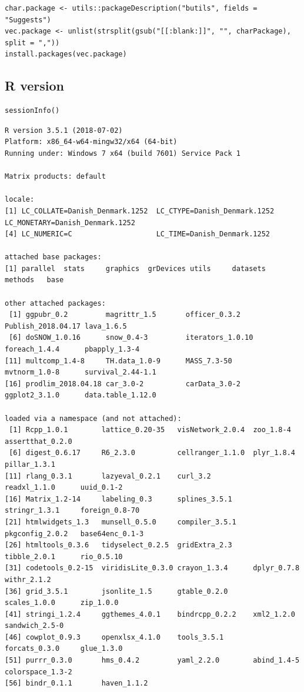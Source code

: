 \documentclass{article}
\begin{document}
\lstset{language=r,label= ,caption= ,captionpos=b,numbers=none}
\begin{lstlisting}
char.package <- utils::packageDescription("butils", fields = "Suggests")
vec.package <- unlist(strsplit(gsub("[[:blank:]]", "", charPackage), split = ","))
install.packages(vec.package)
\end{lstlisting}

\subsection{R version}
\label{sec:orgc6286c1}

\lstset{language=r,label= ,caption= ,captionpos=b,numbers=none}
\begin{lstlisting}
sessionInfo()
\end{lstlisting}

\begin{verbatim}
R version 3.5.1 (2018-07-02)
Platform: x86_64-w64-mingw32/x64 (64-bit)
Running under: Windows 7 x64 (build 7601) Service Pack 1

Matrix products: default

locale:
[1] LC_COLLATE=Danish_Denmark.1252  LC_CTYPE=Danish_Denmark.1252    LC_MONETARY=Danish_Denmark.1252
[4] LC_NUMERIC=C                    LC_TIME=Danish_Denmark.1252    

attached base packages:
[1] parallel  stats     graphics  grDevices utils     datasets  methods   base     

other attached packages:
 [1] ggpubr_0.2         magrittr_1.5       officer_0.3.2      Publish_2018.04.17 lava_1.6.5        
 [6] doSNOW_1.0.16      snow_0.4-3         iterators_1.0.10   foreach_1.4.4      pbapply_1.3-4     
[11] multcomp_1.4-8     TH.data_1.0-9      MASS_7.3-50        mvtnorm_1.0-8      survival_2.44-1.1 
[16] prodlim_2018.04.18 car_3.0-2          carData_3.0-2      ggplot2_3.1.0      data.table_1.12.0 

loaded via a namespace (and not attached):
 [1] Rcpp_1.0.1        lattice_0.20-35   visNetwork_2.0.4  zoo_1.8-4         assertthat_0.2.0 
 [6] digest_0.6.17     R6_2.3.0          cellranger_1.1.0  plyr_1.8.4        pillar_1.3.1     
[11] rlang_0.3.1       lazyeval_0.2.1    curl_3.2          readxl_1.1.0      uuid_0.1-2       
[16] Matrix_1.2-14     labeling_0.3      splines_3.5.1     stringr_1.3.1     foreign_0.8-70   
[21] htmlwidgets_1.3   munsell_0.5.0     compiler_3.5.1    pkgconfig_2.0.2   base64enc_0.1-3  
[26] htmltools_0.3.6   tidyselect_0.2.5  gridExtra_2.3     tibble_2.0.1      rio_0.5.10       
[31] codetools_0.2-15  viridisLite_0.3.0 crayon_1.3.4      dplyr_0.7.8       withr_2.1.2      
[36] grid_3.5.1        jsonlite_1.5      gtable_0.2.0      scales_1.0.0      zip_1.0.0        
[41] stringi_1.2.4     ggthemes_4.0.1    bindrcpp_0.2.2    xml2_1.2.0        sandwich_2.5-0   
[46] cowplot_0.9.3     openxlsx_4.1.0    tools_3.5.1       forcats_0.3.0     glue_1.3.0       
[51] purrr_0.3.0       hms_0.4.2         yaml_2.2.0        abind_1.4-5       colorspace_1.3-2 
[56] bindr_0.1.1       haven_1.1.2
\end{verbatim}
\end{document}
